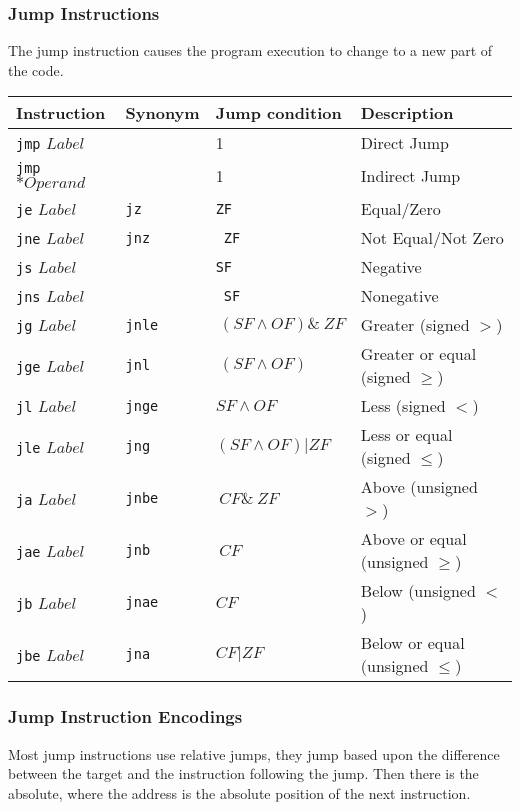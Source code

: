 \documentclass[10pt]{armath}
\newcommand{\s}[1]{\texttt{#1}}
\begin{document}
\subsubsection{Jump Instructions}%
\label{ssub:jump_instructions}

The jump instruction causes the program execution to change to a new part of
the code.

\begin{center}
  \begin{tabular}{l l l l}
    Instruction & Synonym & Jump condition & Description\\
    \hline
    \s{jmp} $Label$ & & 1 & Direct Jump\\
    \s{jmp} $*Operand$ & & 1 & Indirect Jump\\
    \s{je} $Label$ & \s{jz} & \s{ZF} & Equal/Zero\\
    \s{jne} $Label$ & \s{jnz} & \s{~ZF} & Not Equal/Not Zero\\
    \s{js} $Label$ & & \s{SF} & Negative\\
    \s{jns} $Label$ & & \s{~SF} & Nonegative\\
    \s{jg} $Label$ & \s{jnle} & $~(SF\wedge OF)\&~ZF$ & Greater
    (signed $>$)\\
    \s{jge} $Label$ & \s{jnl} & $~(SF\wedge OF)$ & Greater or equal
    (signed $\geq$)\\
    \s{jl} $Label$ & \s{jnge} & $SF\wedge OF$ &Less
    (signed $<$)\\
    \s{jle} $Label$ & \s{jng} & $(SF\wedge OF) | ZF$ & Less or equal
    (signed $\leq$)\\
    \s{ja} $Label$ & \s{jnbe} & $~CF\&~ZF$ & Above (unsigned $>$)\\
    \s{jae} $Label$ & \s{jnb} & $~CF$ & Above or equal (unsigned
    $\geq$)\\
    \s{jb} $Label$ & \s{jnae} & $CF$ & Below (unsigned $<$)\\
    \s{jbe} $Label$ & \s{jna} & $CF|ZF$ & Below or equal (unsigned
    $\leq$)\\
    \hline
  \end{tabular}
\end{center}

\subsubsection{Jump Instruction Encodings}%
\label{ssub:jump_instruction_encodings}

Most jump instructions use relative jumps, they jump based upon the difference
between the target and the instruction following the jump. Then there is the
absolute, where the address is the absolute position of the next instruction.
\end{document}
